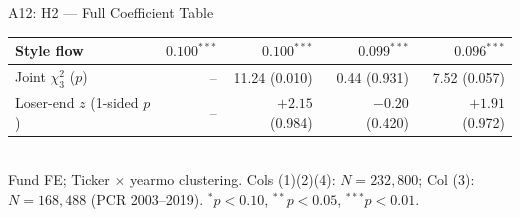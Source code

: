 \documentclass[10pt, aspectratio=169]{beamer}
\begin{document}
\begin{frame}{A12: H2 — Full Coefficient Table}
\begin{tabular}{@{}lrrrr@{}}
    Style flow                           & $0.100^{***}$ & $0.100^{***}$ & $0.099^{***}$ & $0.096^{***}$ \\
    \midrule
    Joint $\chi^2_3$ ($p$)               & --            & 11.24 (0.010) & 0.44 (0.931)  & 7.52 (0.057) \\
    Loser-end $z$ (1-sided $p$)          & --            & $+2.15$ (0.984) & $-0.20$ (0.420) & $+1.91$ (0.972) \\
    \bottomrule
  \end{tabular}
  \vspace{3pt}\\
  \tiny Fund FE; Ticker $\times$ yearmo clustering. Cols (1)(2)(4): $N=232{,}800$; Col (3): $N=168{,}488$ (PCR 2003--2019).
  $^{*}p<0.10$, $^{**}p<0.05$, $^{***}p<0.01$.
\end{frame}

\end{document}
